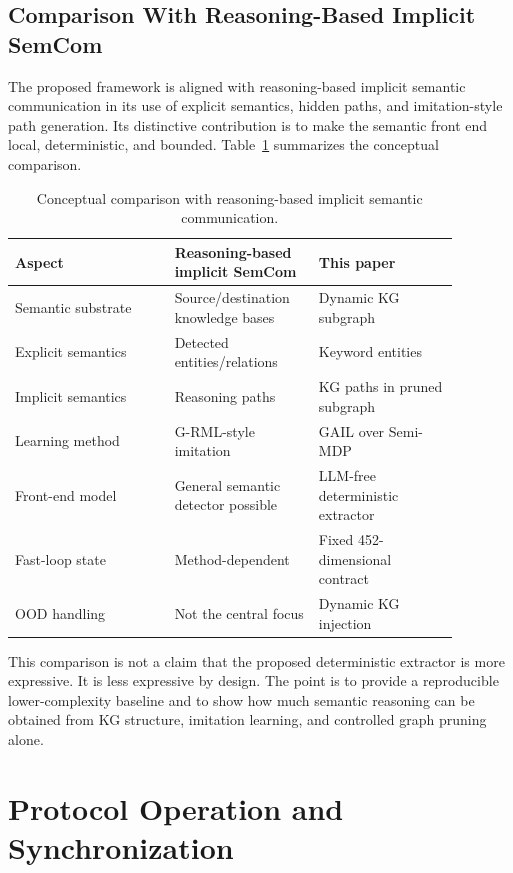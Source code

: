 \documentclass[journal]{IEEEtran}
\begin{document}
\subsection{Comparison With Reasoning-Based Implicit SemCom}

The proposed framework is aligned with reasoning-based implicit semantic communication in its use of explicit semantics, hidden paths, and imitation-style path generation. Its distinctive contribution is to make the semantic front end local, deterministic, and bounded. Table~\ref{tab:comparison} summarizes the conceptual comparison.

\begin{table}[!t]
\centering
\caption{Conceptual comparison with reasoning-based implicit semantic communication.}
\label{tab:comparison}
\footnotesize
\begin{tabular}{p{0.32\linewidth}p{0.27\linewidth}p{0.29\linewidth}}
\toprule
Aspect & Reasoning-based implicit SemCom & This paper\\
\midrule
Semantic substrate & Source/destination knowledge bases & Dynamic KG subgraph\\
Explicit semantics & Detected entities/relations & Keyword entities\\
Implicit semantics & Reasoning paths & KG paths in pruned subgraph\\
Learning method & G-RML-style imitation & GAIL over Semi-MDP\\
Front-end model & General semantic detector possible & LLM-free deterministic extractor\\
Fast-loop state & Method-dependent & Fixed 452-dimensional contract\\
OOD handling & Not the central focus & Dynamic KG injection\\
\bottomrule
\end{tabular}
\end{table}

This comparison is not a claim that the proposed deterministic extractor is more expressive. It is less expressive by design. The point is to provide a reproducible lower-complexity baseline and to show how much semantic reasoning can be obtained from KG structure, imitation learning, and controlled graph pruning alone.

\section{Protocol Operation and Synchronization}
\end{document}

